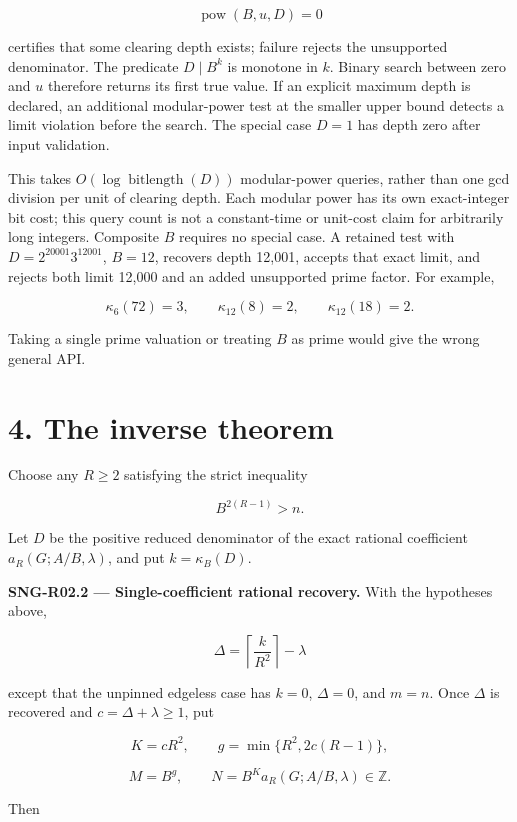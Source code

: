 \documentclass[
  11pt,
  a4paper,
]{report}
\begin{document}
\[
\operatorname{pow}(B,u,D)=0
\]

certifies that some clearing depth exists; failure rejects the
unsupported denominator. The predicate \(D\mid B^k\) is monotone in
\(k\). Binary search between zero and \(u\) therefore returns its first
true value. If an explicit maximum depth is declared, an additional
modular-power test at the smaller upper bound detects a limit violation
before the search. The special case \(D=1\) has depth zero after input
validation.

This takes \(O(\log\operatorname{bitlength}(D))\) modular-power queries,
rather than one gcd division per unit of clearing depth. Each modular
power has its own exact-integer bit cost; this query count is not a
constant-time or unit-cost claim for arbitrarily long integers.
Composite \(B\) requires no special case. A retained test with
\(D=2^{20001}3^{12001}\), \(B=12\), recovers depth 12,001, accepts that
exact limit, and rejects both limit 12,000 and an added unsupported
prime factor. For example,

\[
\kappa_6(72)=3,
\qquad
\kappa_{12}(8)=2,
\qquad
\kappa_{12}(18)=2.
\]

Taking a single prime valuation or treating \(B\) as prime would give
the wrong general API.

\hypertarget{the-inverse-theorem}{%
\section{4. The inverse theorem}\label{the-inverse-theorem}}

Choose any \(R\ge2\) satisfying the strict inequality

\[
\boxed{B^{2(R-1)}>n.}
\]

Let \(D\) be the positive reduced denominator of the exact rational
coefficient \(a_R(G;A/B,\lambda)\), and put \(k=\kappa_B(D)\).

\textbf{SNG-R02.2 --- Single-coefficient rational recovery.} With the
hypotheses above,

\[
\boxed{
\Delta=\left\lceil\frac{k}{R^2}\right\rceil-\lambda
}
\]

except that the unpinned edgeless case has \(k=0\), \(\Delta=0\), and
\(m=n\). Once \(\Delta\) is recovered and \(c=\Delta+\lambda\ge1\), put

\[
K=cR^2,
\qquad
g=\min\{R^2,2c(R-1)\},
\]

\[
M=B^g,
\qquad
N=B^K a_R(G;A/B,\lambda)\in\mathbb Z.
\]

Then
\end{document}
